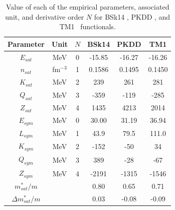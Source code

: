 \begin{table}[!t]
\begin{center}
\begin{tabular}{cccccc} 
  \toprule
  \toprule
  Parameter & Unit & $N$ & BSk14 & PKDD & TM1\\
  \midrule
  $E_{sat}$ & MeV & 0         & -15.85 & -16.27  & -16.26 \\
  $n_{sat}$ & fm$^{-3}$ & 1   & 0.1586 &  0.1495 & 0.1450 \\ 
  $K_{sat}$ & MeV & 2         & 239    &  261    & 281    \\ 
  $Q_{sat}$ & MeV & 3         & -359   &  -119   & -285   \\ 
  $Z_{sat}$ & MeV & 4         & 1435   &  4213   & 2014   \\ 
  $E_{sym}$ & MeV & 0         & 30.00  &  31.19  & 36.94  \\
  $L_{sym}$ & MeV & 1         & 43.9   &  79.5   & 111.0  \\
  $K_{sym}$ & MeV & 2         & -152   &  -50    & 34     \\
  $Q_{sym}$ & MeV & 3         & 389    &  -28    & -67    \\
  $Z_{sym}$ & MeV & 4         & -2191  &  -1315  & -1546  \\
  $m_{sat}^*/m$ & &           & 0.80   &  0.65   & 0.71   \\
  $\Delta m_{sat}^*/m$ & &    & 0.03   &  -0.08  & -0.09  \\
  \bottomrule
  \bottomrule
\end{tabular}
\end{center}
\caption[Empirical parameters for BSk14, PKDD, and TM1]{Value of each of the 
  empirical parameters, associated unit, and derivative order $N$ for BSk14 
  \cite{Goriely2007}, PKDD \cite{Long2004}, and TM1~\cite{Sumiyoshi1995} 
functionals.}\label{table:newemppar}
\end{table}

